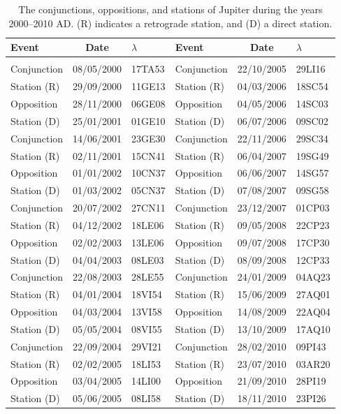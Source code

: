 \clearpage
\begin{table}[!h]\centering
\vspace{0.25cm}
{%
\begin{tabular}{lcl|lcl}
Event & Date & $\lambda$ & Event & Date & $\lambda$\\\hline
&&\\[-1.75ex]
Conjunction & 08/05/2000 & 17TA53  &Conjunction & 22/10/2005 & 29LI16\\
Station (R) & 29/09/2000 & 11GE13 &Station (R) & 04/03/2006 & 18SC54\\
Opposition & 28/11/2000 & 06GE08 &Opposition & 04/05/2006 & 14SC03\\
Station (D) & 25/01/2001 & 01GE10 &Station (D) & 06/07/2006 & 09SC02\\
Conjunction & 14/06/2001 & 23GE30 &Conjunction & 22/11/2006 & 29SC34\\
Station (R) & 02/11/2001 & 15CN41 &Station (R) & 06/04/2007 & 19SG49\\
Opposition & 01/01/2002 & 10CN37 &Opposition & 06/06/2007 & 14SG57\\
Station (D) & 01/03/2002 & 05CN37 &Station (D) & 07/08/2007 & 09SG58\\
Conjunction & 20/07/2002 & 27CN11&Conjunction & 23/12/2007 & 01CP03\\
Station (R) & 04/12/2002 & 18LE06 &Station (R) & 09/05/2008 & 22CP23\\
Opposition & 02/02/2003 & 13LE06 &Opposition & 09/07/2008 & 17CP30\\
Station (D) & 04/04/2003 & 08LE03 &Station (D) & 08/09/2008 & 12CP33\\
Conjunction & 22/08/2003 & 28LE55 &Conjunction & 24/01/2009 & 04AQ23\\
Station (R) & 04/01/2004 & 18VI54 &Station (R) & 15/06/2009 & 27AQ01\\
Opposition & 04/03/2004 & 13VI58 &Opposition & 14/08/2009 & 22AQ04\\
Station (D) & 05/05/2004 & 08VI55 &Station (D) & 13/10/2009 & 17AQ10\\
Conjunction & 22/09/2004 & 29VI21&Conjunction & 28/02/2010 & 09PI43\\
Station (R) & 02/02/2005 & 18LI53 &Station (R) & 23/07/2010 & 03AR20\\
Opposition & 03/04/2005 & 14LI00& Opposition & 21/09/2010 & 28PI19\\
Station (D) & 05/06/2005 & 08LI58&Station (D) & 18/11/2010 & 23PI26\\
\end{tabular}}
\caption{The conjunctions, oppositions, and stations of Jupiter
during the years 2000--2010 AD. (R) indicates a retrograde station, and (D)
a direct station.}\label{vtjupiter}
\end{table}


